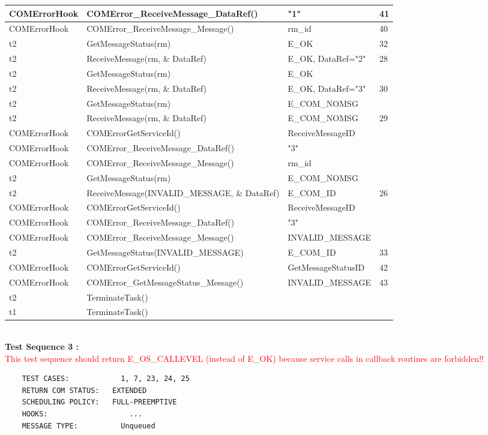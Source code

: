 \documentclass[10pt]{article}
\newlength{\Li}\settowidth{\Li}{Running}
\newlength{\Lii}\setlength{\Lii}{7cm}
\newlength{\Liiii}\setlength{\Liiii}{0.9cm}
\newlength{\Liii}\setlength{\Liii}{\textwidth} \addtolength{\Liii}{-\Li} \addtolength{\Liii}{-\Lii} \addtolength{\Liii}{-\Liiii}
\begin{document}
\begin{supertabular}{|p{\Li}|p{\Lii}|p{\Liii}|p{\Liiii}|}
	COMErrorHook		& COMError\_ReceiveMessage\_DataRef()	& "1"								& 41 \\ \hline
	COMErrorHook		& COMError\_ReceiveMessage\_Message()	& rm\_id							& 40 \\ \hline
	t2	& GetMessageStatus(rm)								& E\_OK							& 32 \\ \hline 
	t2	& ReceiveMessage(rm, \& DataRef)						& E\_OK, DataRef="2"				& 28 \\ \hline 
	t2	& GetMessageStatus(rm)								& E\_OK							& \\ \hline 
	t2	& ReceiveMessage(rm, \& DataRef)						& E\_OK, DataRef="3"				& 30 \\ \hline 
	t2	& GetMessageStatus(rm)								& E\_COM\_NOMSG					& \\ \hline 
	t2	& ReceiveMessage(rm, \& DataRef)						& E\_COM\_NOMSG					& 29 \\ \hline 
	COMErrorHook		& COMErrorGetServiceId()				& ReceiveMessageID				& \\ \hline
	COMErrorHook		& COMError\_ReceiveMessage\_DataRef()	& "3"								& \\ \hline
	COMErrorHook		& COMError\_ReceiveMessage\_Message()	& rm\_id							& \\ \hline
	t2	& GetMessageStatus(rm)								& E\_COM\_NOMSG					& \\ \hline 
	t2	& ReceiveMessage(INVALID\_MESSAGE, \& DataRef)		& E\_COM\_ID						& 26 \\ \hline 
	COMErrorHook		& COMErrorGetServiceId()				& ReceiveMessageID				& \\ \hline
	COMErrorHook		& COMError\_ReceiveMessage\_DataRef()	& "3"								& \\ \hline
	COMErrorHook		& COMError\_ReceiveMessage\_Message()	& INVALID\_MESSAGE				& \\ \hline
	t2	& GetMessageStatus(INVALID\_MESSAGE)				& E\_COM\_ID						& 33 \\ \hline 	
	COMErrorHook		& COMErrorGetServiceId()				& GetMessageStatusID				& 42 \\ \hline
	COMErrorHook		& COMError\_GetMessageStatus\_Message()	& INVALID\_MESSAGE				& 43 \\ \hline	
	t2 	& TerminateTask() 									& 								& \\ \hline 
	t1	& TerminateTask()									&								&\\ \hline 
	\end{supertabular}\\
	
	\textbf{Test Sequence 3 :}\\
	\textcolor{red}{This test sequence should return E\_OS\_CALLEVEL (instead of E\_OK) because service calls in callback routines are forbidden!!}
	\begin{lstlisting}
	TEST CASES:		       1, 7, 23, 24, 25
	RETURN COM STATUS:	 EXTENDED
	SCHEDULING POLICY:   FULL-PREEMPTIVE
	HOOKS:			         ...
	MESSAGE TYPE:	       Unqueued
	\end{lstlisting}
	
	
\end{document}
